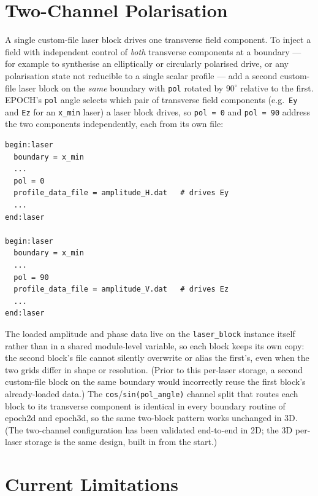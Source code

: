 \documentclass[11pt,a4paper]{article}
\begin{document}
\section{Two-Channel Polarisation}

A single custom-file laser block drives one transverse field component.
To inject a field with independent control of \emph{both} transverse
components at a boundary --- for example to synthesise an elliptically
or circularly polarised drive, or any polarisation state not reducible
to a single scalar profile --- add a second custom-file laser block on
the \emph{same} boundary with \texttt{pol} rotated by $90^{\circ}$
relative to the first. EPOCH's \texttt{pol} angle selects which pair of
transverse field components (e.g.\ \texttt{Ey} and \texttt{Ez} for an
\texttt{x\_min} laser) a laser block drives, so \texttt{pol = 0} and
\texttt{pol = 90} address the two components independently, each from
its own file:

\begin{lstlisting}[style=deck]
begin:laser
  boundary = x_min
  ...
  pol = 0
  profile_data_file = amplitude_H.dat   # drives Ey
  ...
end:laser

begin:laser
  boundary = x_min
  ...
  pol = 90
  profile_data_file = amplitude_V.dat   # drives Ez
  ...
end:laser
\end{lstlisting}

The loaded amplitude and phase data live on the \texttt{laser\_block}
instance itself rather than in a shared module-level variable, so each
block keeps its own copy: the second block's file cannot silently
overwrite or alias the first's, even when the two grids differ in shape
or resolution. (Prior to this per-laser storage, a second custom-file
block on the same boundary would incorrectly reuse the first block's
already-loaded data.) The \texttt{cos}/\texttt{sin(pol\_angle)} channel
split that routes each block to its transverse component is identical in
every boundary routine of epoch2d and epoch3d, so the same two-block
pattern works unchanged in 3D. (The two-channel configuration has been
validated end-to-end in 2D; the 3D per-laser storage is the same design,
built in from the start.)

\section{Current Limitations}
\end{document}
